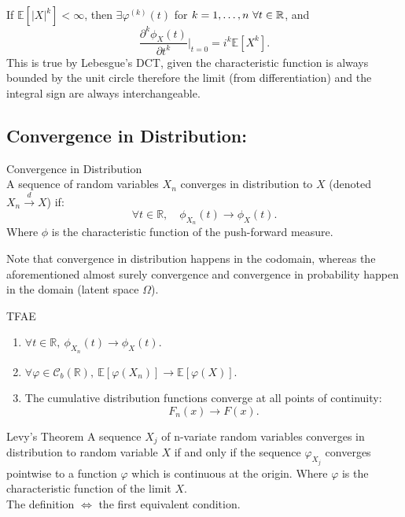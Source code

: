 \begin{thm}{}
If $\mathbb{E}[|X|^k] < \infty$, then $\exists \varphi^{(k)}(t)$ for $k = 1, \dots, n \ \forall t\in {\mathbb{R}}$, and  
\[
\frac{\partial^k \phi_X(t)}{\partial t^k} \bigg|_{t=0} = i^k \mathbb{E}[X^k].
\]
This is true by Lebesgue's DCT, given the characteristic function is always bounded by the unit circle therefore the limit (from differentiation) and the integral sign are always interchangeable. 
\end{thm}


\subsection{Convergence in Distribution:}


\begin{df}{Convergence in Distribution}\\
A sequence of random variables $X_n$ converges in distribution to $X$ (denoted $X_n \xrightarrow{d} X$) if:
\[
\forall t \in \mathbb{R}, \quad \phi_{X_n}(t) \to \phi_X(t).
\]
\noindent Where $\phi$ is the characteristic function of the push-forward measure.	
\end{df}
\begin{rmk}{}
	Note that convergence in distribution happens in the codomain, whereas the aforementioned almost surely convergence and convergence in probability happen in the domain (latent space $\Omega$). 
\end{rmk}



\begin{prop}{TFAE}
\begin{enumerate}
    \item $\forall t \in \mathbb{R}, \ \phi_{X_n}(t) \to \phi_X(t)$.
    \item $\forall \varphi \in \mathscr{C}_b(\mathbb{R}), \ \mathbb{E}[\varphi(X_n)] \to \mathbb{E}[\varphi(X)]$.
    \item The cumulative distribution functions converge at all points of continuity:
    \[
    F_n(x) \to F(x).
    \]
\end{enumerate}	
\end{prop}

\begin{thm}{Levy's Theorem}
	 A sequence $X_j$ of n-variate random variables converges in distribution to random variable $X$ if and only if the sequence $\varphi_{X_j}$ converges pointwise to a function $\varphi$ which is continuous at the origin. Where $\varphi$  is the characteristic function of the limit $X$.\\
	 
	 The definition $\Leftrightarrow$ the first equivalent condition.  
\end{thm}



